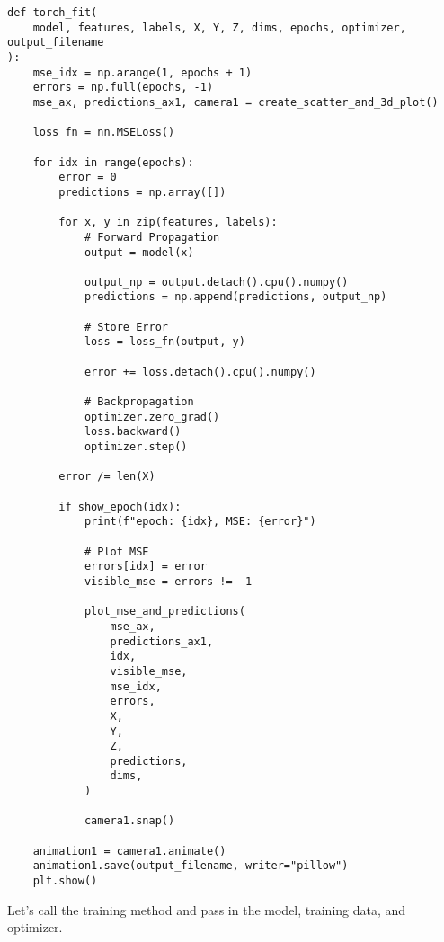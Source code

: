 \documentclass[openany]{book}
\begin{document}
\begin{tcolorbox}
\tiny
\begin{verbatim}
def torch_fit(
    model, features, labels, X, Y, Z, dims, epochs, optimizer, output_filename
):
    mse_idx = np.arange(1, epochs + 1)
    errors = np.full(epochs, -1)
    mse_ax, predictions_ax1, camera1 = create_scatter_and_3d_plot()

    loss_fn = nn.MSELoss()

    for idx in range(epochs):
        error = 0
        predictions = np.array([])

        for x, y in zip(features, labels):
            # Forward Propagation
            output = model(x)

            output_np = output.detach().cpu().numpy()
            predictions = np.append(predictions, output_np)

            # Store Error
            loss = loss_fn(output, y)

            error += loss.detach().cpu().numpy()

            # Backpropagation
            optimizer.zero_grad()
            loss.backward()
            optimizer.step()

        error /= len(X)

        if show_epoch(idx):
            print(f"epoch: {idx}, MSE: {error}")

            # Plot MSE
            errors[idx] = error
            visible_mse = errors != -1

            plot_mse_and_predictions(
                mse_ax,
                predictions_ax1,
                idx,
                visible_mse,
                mse_idx,
                errors,
                X,
                Y,
                Z,
                predictions,
                dims,
            )

            camera1.snap()

    animation1 = camera1.animate()
    animation1.save(output_filename, writer="pillow")
    plt.show()
\end{verbatim}
\end{tcolorbox}

    Let's call the training method and pass in the model, training data, and
optimizer.
\end{document}
